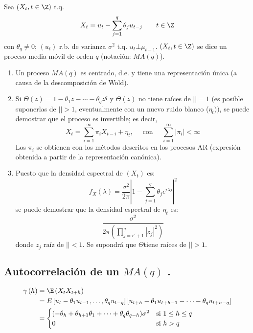 \begin{definicion}
Sea ($X_{t}, t\in \Z)$ t.q.
\[
X_{t} =u_{t} -\sum_{j=1}^q {\theta_{j} u_{t-j} } 
\qquad
t\in \Z
\]
con $\theta_{q} \ne 0$; $\left( {u_{t} } \right)$ r.b. de varianza $\sigma^{2}$ t.q. $u_{t} \bot \mu_{t-1} $. $\left( {X_{t} ,t\in \Z} \right)$ se dice un proceso media m\'{o}vil de orden $q$ (notaci\'{o}n: $MA(q)$).
\end{definicion}

\begin{observacion}
\quad 
\begin{enumerate}
\item Un proceso $MA(q)$ es centrado, d.e. y tiene una representaci\'{o}n \'{u}nica (a causa de la descomposici\'{o}n de Wold).

\item Si $\Theta \left( z \right)=1-\theta_{1} z-\cdots-\theta_{q} z^{q}$ y $\Theta (z)$ no tiene ra\'{i}ces de $\left| \right|=1$ (es posible suponerlas de $\left| \right|>1$, eventualmente con un nuevo ruido blanco ($\eta_{t}))$, se puede demostrar que el proceso es invertible; es decir,
\[
X_{t}=\sum_{i=1}^\infty {\pi_{i}X_{t-i}} +\eta_{t},  \quad\text{ con }\quad  \sum_{i=1}^\infty \left| 
\pi_{i} \right| <\infty  
\]
Los $\pi_{i}$ se obtienen con los m\'{e}todos descritos en los procesos AR (expresi\'{o}n obtenida a partir de la representaci\'{o}n can\'{o}nica).

\item Puesto que la densidad espectral de $(X_{{t}})$ es:
\[
f_{X} \left( \lambda \right)=\frac{\sigma^{2}}{2\pi }\left| {1-\sum_{j=1}^q {\theta_{j} e^{i\lambda j}} } \right|^{2}
\]
se puede demostrar que la densidad espectral de $\eta_{t}$ es:
\[
\frac{\sigma^{2}}{2\pi \left( {\prod_{j={r}'+1}^{q} \left| 
{z_{j} } \right|^{2}} \right)}
\]
donde $z_{j}$ ra\'{i}z de $\left| \right|<1$. Se supondr\'{a} que $\Theta $tiene ra\'{i}ces de $\left| \right|>1$. 
\end{enumerate}
\end{observacion}

\subsection{Autocorrelaci\'{o}n de un $MA(q)$ .}
\begin{align*}
\gamma \left( h \right)
	 &=\E\left( {X_{t} X_{t+h} } \right)\\
	 &=E\left[ {u_{t} -\theta_{1} u_{t-1} ,\ldots,\theta_{q} u_{t-q} } \right]\left[ {u_{t+h} -\theta_{1} u_{t+h-1} -\dots-\theta_{q} u_{t+h-q} } \right]\\
	 &=\begin{cases}
	    (-\theta_{h} +\theta_{h+1} \theta_{1} +\cdots+\theta_{q} \theta_{q-h})\sigma^{2} & \text{si }1\le h\le q \\ 
	    0 & \text{si } h>q
	   \end{cases}
\end{align*}

